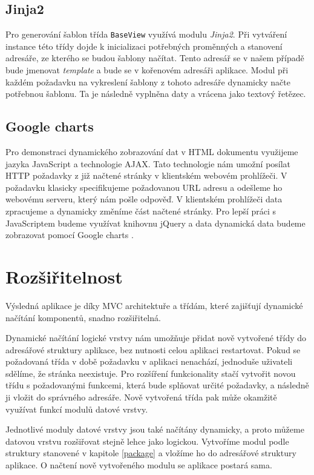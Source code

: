     \subsection{Jinja2}
    Pro generování šablon třída \verb|BaseView| využívá modulu \emph{Jinja2}. Při vytváření instance této třídy dojde k inicializaci potřebných proměnných a stanovení adresáře, ze kterého se budou šablony načítat. Tento adresář se v našem případě bude jmenovat \emph{template} a bude se v kořenovém adresáři aplikace. Modul při každém požadavku na vykreslení šablony z tohoto adresáře dynamicky načte potřebnou šablonu. Ta je následně vyplněna daty a vrácena jako textový řetězec.
    \subsection{Google charts}
    Pro demonstraci dynamického zobrazování dat v HTML dokumentu využijeme jazyka JavaScript a technologie AJAX. Tato technologie nám umožní posílat HTTP požadavky z již načtené stránky v klientském webovém prohlížeči. V požadavku klasicky specifikujeme požadovanou URL adresu a odešleme ho webovému serveru, který nám pošle odpověď. V klientském prohlížeči data zpracujeme a dynamicky změníme část načtené stránky. Pro lepší práci s JavaScriptem budeme využívat knihovnu jQuery \cite{jquery} a data dynamická data budeme zobrazovat pomocí Google charts \cite{google}.

\section{Rozšiřitelnost}
Výsledná aplikace je díky MVC architektuře a třídám, které zajišťují dynamické načítání komponentů, snadno rozšiřitelná.

Dynamické načítání logické vrstvy nám umožňuje přidat nově vytvořené třídy do adresářové struktury aplikace, bez nutnosti celou aplikaci restartovat. Pokud se požadovaná třída v době požadavku v aplikaci nenachází, jednoduše uživateli sdělíme, že stránka neexistuje. Pro rozšíření funkcionality stačí vytvořit novou třídu s požadovanými funkcemi, která bude splňovat určité požadavky, a následně ji vložit do správného adresáře. Nově vytvořená třída pak může okamžitě využívat funkcí modulů datové vrstvy.

Jednotlivé moduly datové vrstvy jsou také načítány dynamicky, a proto můžeme datovou vrstvu rozšiřovat stejně lehce jako logickou. Vytvoříme modul podle struktury stanovené v kapitole \ref{package} a vložíme ho do adresářové struktury aplikace. O načtení nově vytvořeného modulu se aplikace postará sama.

